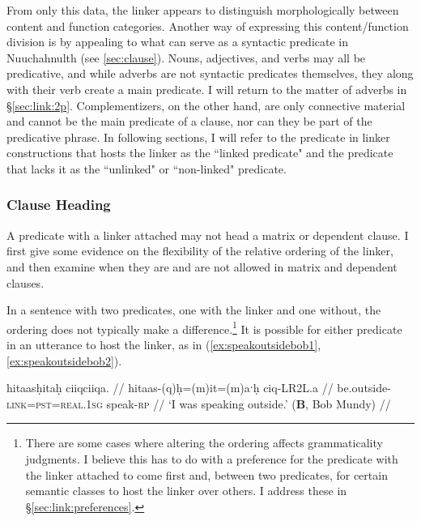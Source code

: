 From only this data, the linker appears to distinguish morphologically between content and function categories. Another way of expressing this content/function division is by appealing to what can serve as a syntactic predicate in Nuuchahnulth (see \ref{sec:clause}). Nouns, adjectives, and verbs may all be predicative, and while adverbs are not syntactic predicates themselves, they along with their verb create a main predicate. I will return to the matter of adverbs in \S\ref{sec:link:2p}. Complementizers, on the other hand, are only connective material and cannot be the main predicate of a clause, nor can they be part of the predicative phrase. In following sections, I will refer to the predicate in linker constructions that hosts the linker as the ``linked predicate" and the predicate that lacks it as the ``unlinked" or ``non-linked" predicate.


\subsubsection{Clause Heading} \label{sec:link:clause}

A predicate with a linker attached may not head a matrix or dependent clause. I first give some evidence on the flexibility of the relative ordering of the linker, and then examine when they are and are not allowed in matrix and dependent clauses.

In a sentence with two predicates, one with the linker and one without, the ordering does not typically make a difference.\footnote{There are some cases where altering the ordering affects grammaticality judgments. I believe this has to do with a preference for the predicate with the linker attached to come first and, between two predicates, for certain semantic classes to host the linker over others. I address these in \S\ref{sec:link:preferences}.} It is possible for either predicate in an utterance to host the linker, as in (\ref{ex:speakoutsidebob1}, \ref{ex:speakoutsidebob2}).

\ex \label{ex:speakoutsidebob1}
\begingl
\glpreamble hitaasḥitaḥ ciiqciiqa. //
\gla hitaas-(q)ḥ=(m)it=(m)aˑḥ ciq-LR2L.a //
\glb be.outside-\textsc{link}=\textsc{pst}=\textsc{real.1sg} speak-\textsc{rp} //
\glft `I was speaking outside.' (\textbf{B}, Bob Mundy) //
\endgl
\xe

